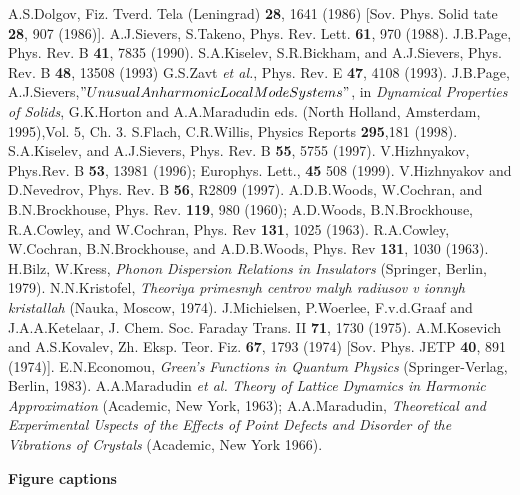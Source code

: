 {{\begin{thebibliography}{99}
A.S.Dolgov, Fiz. Tverd. Tela (Leningrad) {\bf 28}, 1641 (1986)
[Sov. Phys. Solid tate {\bf 28}, 907 (1986)].
A.J.Sievers, S.Takeno, Phys. Rev. Lett. {\bf 61}, 970 (1988).
J.B.Page, Phys. Rev. B {\bf 41}, 7835 (1990).
S.A.Kiselev, S.R.Bickham, and A.J.Sievers, Phys. Rev. B {\bf 48},
13508 (1993)
G.S.Zavt {\it et al.}, Phys. Rev. E {\bf 47}, 4108 (1993).
J.B.Page, A.J.Sievers,$"Unusual Anharmonic Local Mode Systems"$,
in {\it Dynamical Properties of Solids}, G.K.Horton and 
A.A.Maradudin eds. (North Holland, Amsterdam, 1995),Vol. 5,  Ch. 3.
S.Flach, C.R.Willis, Physics Reports {\bf 295},181 (1998).
S.A.Kiselev, and A.J.Sievers, Phys. Rev. B {\bf 55}, 5755 (1997).
V.Hizhnyakov, Phys.Rev. B {\bf 53}, 13981 (1996); Europhys. Lett., 
{\bf 45} 508 (1999).  
V.Hizhnyakov and D.Nevedrov, Phys. Rev. B {\bf 56}, R2809 (1997). 
A.D.B.Woods, W.Cochran, and B.N.Brockhouse,
Phys. Rev. {\bf 119}, 980 (1960);
A.D.Woods, B.N.Brockhouse, R.A.Cowley, and W.Cochran,
Phys. Rev {\bf 131}, 1025 (1963).
R.A.Cowley, W.Cochran, B.N.Brockhouse, and A.D.B.Woods,
Phys. Rev {\bf 131}, 1030 (1963).
H.Bilz, W.Kress, {\it Phonon Dispersion Relations in
Insulators} (Springer, Berlin, 1979).
N.N.Kristofel, {\it Theoriya primesnyh centrov malyh radiusov
v ionnyh kristallah}  (Nauka, Moscow, 1974).
J.Michielsen, P.Woerlee, F.v.d.Graaf and J.A.A.Ketelaar, J. Chem. Soc. Faraday Trans. II {\bf 71}, 1730 (1975).
A.M.Kosevich and A.S.Kovalev, Zh. Eksp. Teor. Fiz. {\bf 67}, 1793 (1974)
[Sov. Phys. JETP {\bf 40}, 891 (1974)].
E.N.Economou, {\it Green's Functions in Quantum Physics} 
(Springer-Verlag, Berlin, 1983). 
A.A.Maradudin {\it et al.} {\it Theory of Lattice Dynamics in  
Harmonic Approximation} (Academic, New York, 1963);   
A.A.Maradudin, {\it Theoretical and 
Experimental Uspects of the Effects of Point Defects and Disorder of the  
Vibrations of Crystals} (Academic, New York 1966).

\end{thebibliography} 

\bigskip

\begin{center}
{\Large {\bf Figure captions}}
\end{center}

\bigskip

}}
